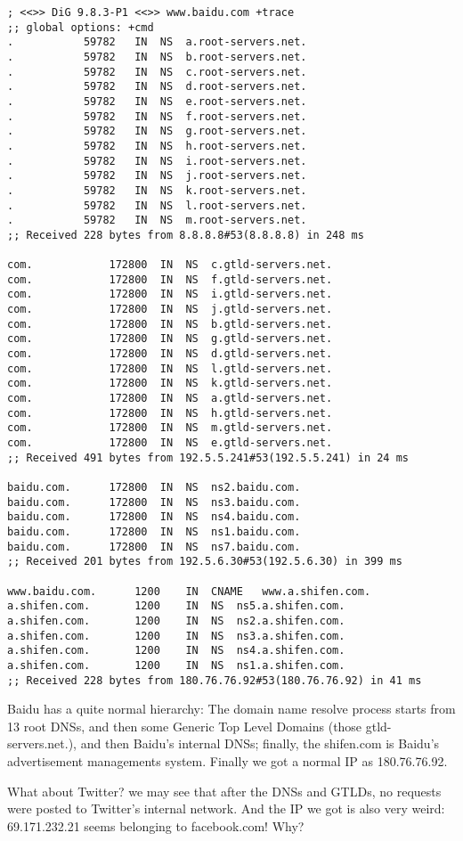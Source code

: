 \documentclass{article}
\begin{document}
\begin{lstlisting}[numberstyle=\tiny\monaco,
        basicstyle=\small\monaco]
; <<>> DiG 9.8.3-P1 <<>> www.baidu.com +trace
;; global options: +cmd
.			59782	IN	NS	a.root-servers.net.
.			59782	IN	NS	b.root-servers.net.
.			59782	IN	NS	c.root-servers.net.
.			59782	IN	NS	d.root-servers.net.
.			59782	IN	NS	e.root-servers.net.
.			59782	IN	NS	f.root-servers.net.
.			59782	IN	NS	g.root-servers.net.
.			59782	IN	NS	h.root-servers.net.
.			59782	IN	NS	i.root-servers.net.
.			59782	IN	NS	j.root-servers.net.
.			59782	IN	NS	k.root-servers.net.
.			59782	IN	NS	l.root-servers.net.
.			59782	IN	NS	m.root-servers.net.
;; Received 228 bytes from 8.8.8.8#53(8.8.8.8) in 248 ms

com.			172800	IN	NS	c.gtld-servers.net.
com.			172800	IN	NS	f.gtld-servers.net.
com.			172800	IN	NS	i.gtld-servers.net.
com.			172800	IN	NS	j.gtld-servers.net.
com.			172800	IN	NS	b.gtld-servers.net.
com.			172800	IN	NS	g.gtld-servers.net.
com.			172800	IN	NS	d.gtld-servers.net.
com.			172800	IN	NS	l.gtld-servers.net.
com.			172800	IN	NS	k.gtld-servers.net.
com.			172800	IN	NS	a.gtld-servers.net.
com.			172800	IN	NS	h.gtld-servers.net.
com.			172800	IN	NS	m.gtld-servers.net.
com.			172800	IN	NS	e.gtld-servers.net.
;; Received 491 bytes from 192.5.5.241#53(192.5.5.241) in 24 ms

baidu.com.		172800	IN	NS	ns2.baidu.com.
baidu.com.		172800	IN	NS	ns3.baidu.com.
baidu.com.		172800	IN	NS	ns4.baidu.com.
baidu.com.		172800	IN	NS	ns1.baidu.com.
baidu.com.		172800	IN	NS	ns7.baidu.com.
;; Received 201 bytes from 192.5.6.30#53(192.5.6.30) in 399 ms

www.baidu.com.		1200	IN	CNAME	www.a.shifen.com.
a.shifen.com.		1200	IN	NS	ns5.a.shifen.com.
a.shifen.com.		1200	IN	NS	ns2.a.shifen.com.
a.shifen.com.		1200	IN	NS	ns3.a.shifen.com.
a.shifen.com.		1200	IN	NS	ns4.a.shifen.com.
a.shifen.com.		1200	IN	NS	ns1.a.shifen.com.
;; Received 228 bytes from 180.76.76.92#53(180.76.76.92) in 41 ms
\end{lstlisting}

Baidu has a quite normal hierarchy: The domain name resolve process starts from 13 root DNSs, and then some Generic Top Level Domains (those gtld-servers.net.), and then Baidu's internal DNSs; finally, the shifen.com is Baidu's advertisement managements system. Finally we got a normal IP as 180.76.76.92.

What about Twitter? we may see that after the DNSs and GTLDs, no requests were posted to Twitter's internal network. And the IP we got is also very weird: 69.171.232.21 seems belonging to facebook.com! Why?
\end{document}
